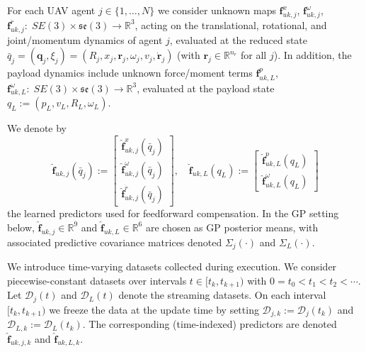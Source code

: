 \documentclass[letterpaper, 10 pt, conference]{ieeeconf}  %
\newcommand{\0}{\matr{0}}
\begin{document}
For each UAV agent $j\in\{1,\dots,N\}$ we consider unknown maps
$\mathbf f_{uk,j}^{x}$, $\mathbf f_{uk,j}^{\omega}$, $\mathbf f_{uk,j}^{\dot r}:\; SE(3)\times\mathfrak{se}(3)\rightarrow\mathbb R^3$,
acting on the translational, rotational, and joint/momentum dynamics of agent $j$, evaluated at the reduced state
$\bar q_j=(\mathbf q_j,\xi_j)=(R_j,x_j,\mathbf r_j,\omega_j,v_j,\dot{\mathbf r}_j)$ (with $\mathbf r_j\in\mathbb R^{n_r}$ for all $j$).
In addition, the payload dynamics include unknown force/moment terms
$\mathbf f_{uk,L}^{p}$, $\mathbf f_{uk,L}^{\omega}:\; SE(3)\times\mathfrak{se}(3)\rightarrow\mathbb R^3$,
evaluated at the payload state $q_L:=(p_L,v_L,R_L,\omega_L)$.

We denote by
\[
\hat{\mathbf f}_{uk,j}(\bar q_j):=
\begin{bmatrix}
\hat{\mathbf f}_{uk,j}^{x}(\bar q_j)\\
\hat{\mathbf f}_{uk,j}^{\omega}(\bar q_j)\\
\hat{\mathbf f}_{uk,j}^{\dot r}(\bar q_j)
\end{bmatrix},\quad 
\hat{\mathbf f}_{uk,L}(q_L):=
\begin{bmatrix}
\hat{\mathbf f}_{uk,L}^{p}(q_L)\\
\hat{\mathbf f}_{uk,L}^{\omega}(q_L)
\end{bmatrix}
\]
the learned predictors used for feedforward compensation. In the GP setting below,
$\hat{\mathbf f}_{uk,j}\in\mathbb R^9$ and $\hat{\mathbf f}_{uk,L}\in\mathbb R^6$ are chosen as GP posterior means, with associated predictive covariance matrices
denoted $\Sigma_j(\cdot)$ and $\Sigma_L(\cdot)$.

We introduce time-varying datasets collected during execution. We consider piecewise-constant datasets over intervals
$t\in[t_k,t_{k+1})$ with $0=t_0<t_1<t_2<\cdots$. Let $\mathcal D_j(t)$ and $\mathcal D_L(t)$ denote the streaming datasets.
On each interval $[t_k,t_{k+1})$ we freeze the data at the update time by setting
$\mathcal D_{j,k}:=\mathcal D_j(t_k)$ and $\mathcal D_{L,k}:=\mathcal D_L(t_k)$.
The corresponding (time-indexed) predictors are denoted $\hat{\mathbf f}_{uk,j,k}$ and $\hat{\mathbf f}_{uk,L,k}$.
\end{document}
